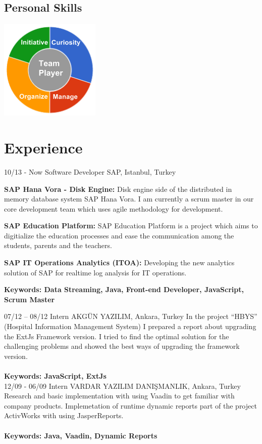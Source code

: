 \documentclass[]{friggeri-cv}
\begin{document}
\begin{aside}
  \section{Personal Skills}
    \includegraphics[scale=0.62]{img/personal.png}
    ~
\end{aside}

\section{Experience}
\begin{entrylist}
  \entry
    {10/13 - Now}
    {Software Developer}
    {SAP, Istanbul, Turkey}
    {
    \item \textbf{SAP Hana Vora - Disk Engine:} Disk engine side of the distributed in memory database system SAP Hana Vora. I am currently a scrum master in our core development team which uses agile methodology for development.
    \item \textbf{SAP Education Platform:} SAP Education Platform is a project which aims to digitialize the education processes and ease the communication among the students, parents and the teachers.
    \item \textbf{SAP IT Operations Analytics (ITOA):} Developing the new analytics solution of SAP for realtime log analysis for IT operations.\\
    \item \textbf{Keywords: Data Streaming, Java, Front-end Developer, JavaScript, Scrum Master\\}
    }
  \entry
    {07/12 – 08/12 }
    {Intern}
    {AKGÜN YAZILIM, Ankara, Turkey}
    {In the project “HBYS” (Hospital Information Management System) I prepared a report about upgrading the ExtJs Framework version. I tried to find the optimal solution for the challenging problems and showed the best ways of upgrading the framework version.\\\\
    \textbf{Keywords: JavaScript, ExtJs\\}}
    \entry
    {12/09 - 06/09}
    {Intern}
    {VARDAR YAZILIM DANIŞMANLIK, Ankara, Turkey}
    {Research and basic implementation with using Vaadin to get familiar with company products. Implemetation of runtime dynamic reports part of the project ActivWorks with using JasperReports.\\\\
    \textbf{Keywords: Java, Vaadin, Dynamic Reports\\}
    }
\end{entrylist}
\end{document}

